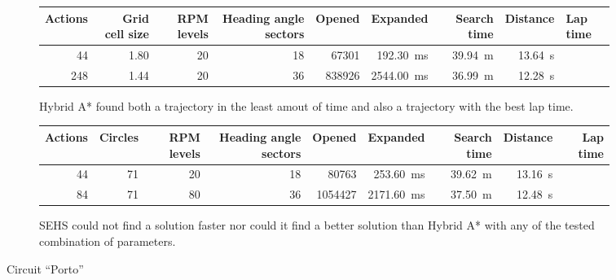 \begin{figure}[!tbp]
	\begin{subfigure}[t]{\textwidth}
		\centering
		\begin{tabular}{r r r r r r r r}%
			\toprule
			Actions & Grid cell size & RPM levels & Heading angle sectors & Opened & Expanded & Search time & Distance & Lap time \\	
			\midrule
			\num{44} & \num{1.80} & \num{20} & \num{18} & \bftab \num{67301} & \bftab \SI{192.30}{\milli\second} & \SI{39.94}{\meter} & \SI{13.64}{\second} \\
			\num{248} & \num{1.44} & \num{20} & \num{36} & \num{838926} & \SI{2544.00}{\milli\second} & \SI{36.99}{\meter} & \bftab \SI{12.28}{\second} \\
			\bottomrule
		\end{tabular}
		\caption{Hybrid A* found both a trajectory in the least amout of time and also a trajectory with the best lap time.}
		\label{table:porto-hybrid_astar}
	\end{subfigure}
	
	\begin{subfigure}[t]{\textwidth}
		\centering
		\begin{tabular}{r r r r r r r r r}%
			\toprule
			Actions & Circles & RPM levels & Heading angle sectors & Opened & Expanded & Search time & Distance & Lap time \\			
			\midrule
			\num{44} & \num{71} & \num{20} & \num{18} & \num{80763} & \SI{253.60}{\milli\second} & \SI{39.62}{\meter} & \SI{13.16}{\second} \\
			\num{84} & \num{71} & \num{80} & \num{36} & \num{1054427} & \SI{2171.60}{\milli\second} & \SI{37.50}{\meter} & \SI{12.48}{\second} \\
			\bottomrule
		\end{tabular}
		\caption{SEHS could not find a solution faster nor could it find a better solution than Hybrid A* with any of the tested combination of parameters.}
		\label{table:porto-sehs}
	\end{subfigure}
	
	\vspace{0.75cm}
	
	\caption{Circuit ``Porto''}
	\label{fig:porto}
\end{figure}

